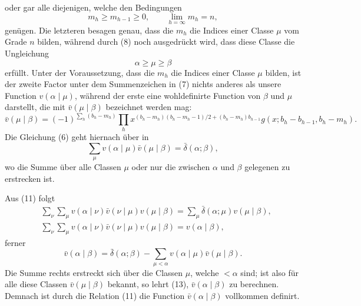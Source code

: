 \documentclass[11pt,a4paper]{article}
\begin{document}
oder gar alle diejenigen, welche den Bedingungen
\begin{equation}
 m_h\ge m_{h-1}\ge0,
 \qquad \lim_{h=\infty}m_h=n,
\tag{9}
\end{equation}
genügen. Die letzteren besagen genau, dass die $m_h$ die Indices einer Classe $\mu$ vom Grade $n$ bilden, während durch (8) noch ausgedrückt wird, dass diese Classe die Ungleichung
\[
 \alpha\ge\mu\ge\beta
\]
erfüllt. Unter der Voraussetzung, dass die $m_h$ die Indices einer Classe $\mu$ bilden, ist der zweite Factor unter dem Summenzeichen in (7) nichts anderes als unsere Function $v(\alpha\mid\mu)$, während der erste eine wohldefinirte Function von $\beta$ und $\mu$ darstellt, die mit $\bar v(\mu\mid\beta)$ bezeichnet werden mag:
\begin{equation}
 \bar v(\mu\mid\beta)=(-1)^{\sum_h(b_h-m_h)}
 \prod_h x^{(b_h-m_h)(b_h-m_h-1)/2+(b_h-m_h)b_{h-1}}
 g(x;b_h-b_{h-1},b_h-m_h).
\tag{10}
\end{equation}
Die Gleichung (6) geht hiernach über in
\begin{equation}
 \sum_{\mu}v(\alpha\mid\mu)\bar v(\mu\mid\beta)=\bar\delta(\alpha;\beta),
\tag{11}
\end{equation}
wo die Summe über alle Classen $\mu$ oder nur die zwischen $\alpha$ und $\beta$ gelegenen zu erstrecken ist.

Aus (11) folgt
\begin{align*}
&\sum_\nu\sum_\mu v(\alpha\mid\nu)\bar v(\nu\mid\mu)v(\mu\mid\beta)
 =\sum_\mu\bar\delta(\alpha;\mu)v(\mu\mid\beta),\\
&\sum_\nu\sum_\mu v(\alpha\mid\nu)\bar v(\nu\mid\mu)v(\mu\mid\beta)=v(\alpha\mid\beta),
\tag{12}
\end{align*}
ferner
\begin{equation}
 \bar v(\alpha\mid\beta)=\bar\delta(\alpha;\beta)
 -\sum_{\mu<\alpha}v(\alpha\mid\mu)\bar v(\mu\mid\beta).
\tag{13}
\end{equation}
Die Summe rechts erstreckt sich über die Classen $\mu$, welche $<\alpha$ sind; ist also für alle diese Classen $\bar v(\mu\mid\beta)$ bekannt, so lehrt (13), $\bar v(\alpha\mid\beta)$ zu berechnen. Demnach ist durch die Relation (11) die Function $\bar v(\alpha\mid\beta)$ vollkommen definirt.
\end{document}
